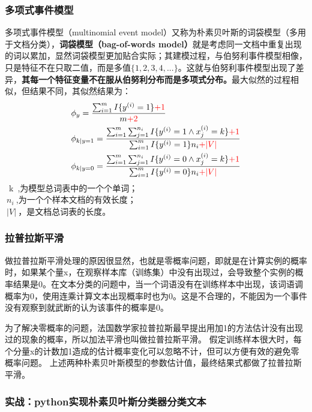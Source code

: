 \subsubsection{多项式事件模型} %
多项式事件模型（multinomial event model）又称为朴素贝叶斯的词袋模型（多用于文档分类），\textbf{词袋模型（bag-of-words model）}就是考虑同一文档中重复出现的词以累加，显然词袋模型更加贴合实际；其建模过程，与伯努利事件模型相像，只是特征不在只取二值，而是多值$\{1,2,3,4,...\}$。这就与伯努利事件模型出现了差异，\textbf{其每一个特征变量不在服从伯努利分布而是多项式分布。}最大似然的过程相似，但结果不同，其似然结果为：
\begin{equation}\nonumber
\begin{split}
  &\phi_y = \frac{\sum_{i=1}^{m}I\{y^{(i)}=1\}{\color{red}{+1}}}{m{\color{red}{+2}}}\\
  &\phi_{k|y=1}=\frac{\sum_{i=1}^{m}\sum_{j=1}^{n_i}I\{y^{(i)}=1\wedge x_j^{(i)}=k\}{\color{red}{+1}}}  {\sum_{i=1}^{m}I\{y^{(i)}=1\}n_i{\color{red}{+|V|}}}\\
  &\phi_{k|y=0}=\frac{\sum_{i=1}^{m}\sum_{j=1}^{n_i}I\{y^{(i)}=0\wedge x_j^{(i)}=k\}{\color{red}{+1}}}{\sum_{i=1}^{m}I\{y^{(i)}=0\}n_i{\color{red}{+|V|}}}\\
\end{split}
\end{equation}
~k~,为模型总词表中的一个个单词；\\$~n_i~$,为一个个样本文档的有效长度；\\$~|V|~$，是文档总词表的长度。

\subsubsection{拉普拉斯平滑}
做拉普拉斯平滑处理的原因很显然，也就是零概率问题，即就是在计算实例的概率时，如果某个量x，在观察样本库（训练集）中没有出现过，会导致整个实例的概率结果是0。在文本分类的问题中，当一个词语没有在训练样本中出现，该词语调概率为0，使用连乘计算文本出现概率时也为0。这是不合理的，不能因为一个事件没有观察到就武断的认为该事件的概率是0。

为了解决零概率的问题，法国数学家拉普拉斯最早提出用加1的方法估计没有出现过的现象的概率，所以加法平滑也叫做拉普拉斯平滑。
假定训练样本很大时，每个分量x的计数加1造成的估计概率变化可以忽略不计，但可以方便有效的避免零概率问题。
上述两种朴素贝叶斯模型的参数估计值，最终结果式都做了拉普拉斯平滑。
\subsubsection{实战：python实现朴素贝叶斯分类器分类文本}
